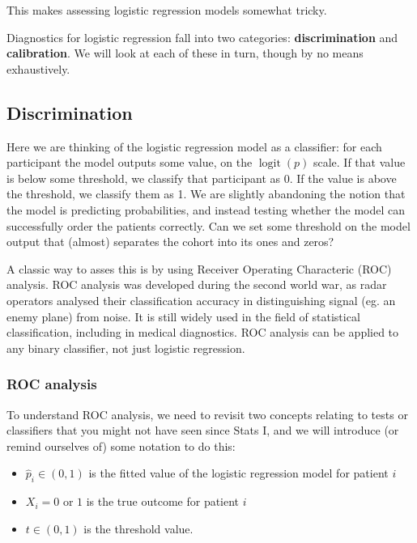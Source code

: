 \documentclass[
  openany]{book}
\providecommand{\tightlist}{%
  \setlength{\itemsep}{0pt}\setlength{\parskip}{0pt}}
\theoremstyle{definition}
\theoremstyle{definition}
\theoremstyle{definition}
\theoremstyle{definition}
\theoremstyle{remark}
\begin{document}
This makes assessing logistic regression models somewhat tricky.

Diagnostics for logistic regression fall into two categories: \textbf{discrimination} and \textbf{calibration}. We will look at each of these in turn, though by no means exhaustively.

\subsection{Discrimination}\label{discrimination}

Here we are thinking of the logistic regression model as a classifier: for each participant the model outputs some value, on the \(\operatorname{logit}\left(p\right)\) scale. If that value is below some threshold, we classify that participant as 0. If the value is above the threshold, we classify them as 1. We are slightly abandoning the notion that the model is predicting probabilities, and instead testing whether the model can successfully order the patients correctly. Can we set some threshold on the model output that (almost) separates the cohort into its ones and zeros?

A classic way to asses this is by using Receiver Operating Characteric (ROC) analysis. ROC analysis was developed during the second world war, as radar operators analysed their classification accuracy in distinguishing signal (eg. an enemy plane) from noise. It is still widely used in the field of statistical classification, including in medical diagnostics. ROC analysis can be applied to any binary classifier, not just logistic regression.

\subsubsection{ROC analysis}\label{roc-analysis}

To understand ROC analysis, we need to revisit two concepts relating to tests or classifiers that you might not have seen since Stats I, and we will introduce (or remind ourselves of) some notation to do this:

\begin{itemize}
\tightlist
\item
  \(\hat{p}_i\in\left(0,1\right)\) is the fitted value of the logistic regression model for patient \(i\)
\item
  \(X_i=0\) or \(1\) is the true outcome for patient \(i\)
\item
  \(t\in\left(0,1\right)\) is the threshold value.
\end{itemize}
\end{document}
